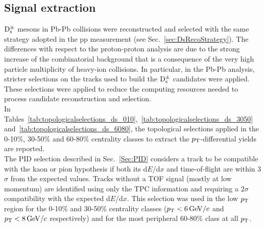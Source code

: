 \subsection{Signal extraction}
\label{sec:SelectionPbPb}
${\rm D_s^{\pm}}$ mesons in Pb-Pb collisions were reconstructed 
and selected with the same strategy adopted in the pp 
measurement (see Sec.~\ref{sec:DsRecoStrategy}). The differences with respect to
the proton-proton analysis are due to the strong increase 
of the combinatorial background that is a consequence of the very 
high particle multiplicity of heavy-ion collisions. In particular, 
in the Pb-Pb analysis, stricter selections on the tracks 
used to build the ${\rm D_s^{\pm}}$ candidates were applied. 
These selections were applied to reduce the computing resources 
needed to process candidate reconstruction and
selection. \\



In Tables~\ref{tab:topologicalselections_ds_010},~\ref{tab:topologicalselections_ds_3050} 
and~\ref{tab:topologicalselections_ds_6080}, the topological selections applied 
in the 0-10$\%$, 30-50\% and 60-80$\%$ centrality classes
to extract the $p_{\rm T}$-differential yields are reported.\\



The PID selection described in Sec.~\ref{Sec:PID} considers a track to be 
compatible with the kaon or pion hypothesis 
if both its d$E$/d$x$ and time-of-flight are within 3$\sigma$ from the expected values. 
Tracks without a TOF signal (mostly at low momentum) are 
identified using only the TPC information and requiring a 2$\sigma$ 
compatibility with the expected d$E$/d$x$. This selection was used 
in the low $p_{\rm T}$ region for the 0-10\% and 30-50\% centrality classes 
($p_{\rm T} < 6 \, \mathrm{GeV}/c$ and $p_{\rm T} < 8 \, \mathrm{GeV}/c$ respectively) 
and for the most peripheral 60-80\% class at all $p_{\rm T}$.



